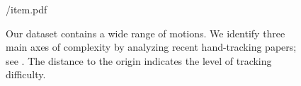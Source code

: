 \begin{figure}[t!]
\centering
\begin{overpic} 
[width=\linewidth]
{\currfiledir/item.pdf}
\end{overpic}
\caption{
% 
Our dataset contains a wide range of motions.
We identify three main axes of complexity by analyzing recent hand-tracking papers; see \VideoSpace{}.
The distance to the origin indicates the level of tracking difficulty.
% 
}
\label{fig:motiontypes}
\end{figure}